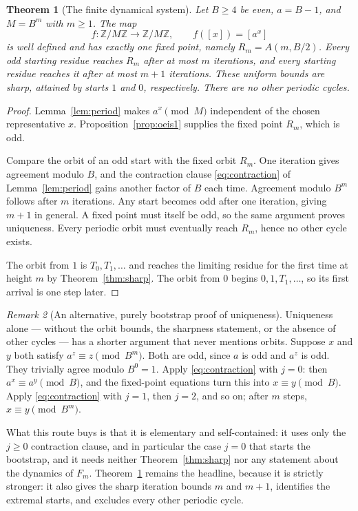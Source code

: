 \documentclass[11pt,letterpaper]{article}
\numberwithin{equation}{section}
\newtheorem{theorem}{Theorem}[section]
\theoremstyle{definition}
\theoremstyle{remark}
\newtheorem{remark}[theorem]{Remark}
\newcommand{\Z}{\mathbb Z}
\begin{document}
\begin{theorem}[The finite dynamical system]\label{thm:dynamics}
Let $B\ge4$ be even, $a=B-1$, and $M=B^m$ with $m\ge1$. The map
\[
 f:\Z/M\Z\longrightarrow\Z/M\Z,\qquad f([x])=[a^x]
\]
is well defined and has exactly one fixed point, namely $R_m=A(m,B/2)$. Every odd starting residue reaches $R_m$ after at most $m$ iterations, and every starting residue reaches it after at most $m+1$ iterations. These uniform bounds are sharp, attained by starts $1$ and $0$, respectively. There are no other periodic cycles.
\end{theorem}
\begin{proof}
Lemma~\ref{lem:period} makes $a^x\pmod M$ independent of the chosen representative $x$. Proposition~\ref{prop:oeis1} supplies the fixed point $R_m$, which is odd.

Compare the orbit of an odd start with the fixed orbit $R_m$. One iteration gives agreement modulo $B$, and the contraction clause \eqref{eq:contraction} of Lemma~\ref{lem:period} gains another factor of $B$ each time. Agreement modulo $B^m$ follows after $m$ iterations. Any start becomes odd after one iteration, giving $m+1$ in general. A fixed point must itself be odd, so the same argument proves uniqueness. Every periodic orbit must eventually reach $R_m$, hence no other cycle exists.

The orbit from $1$ is $T_0,T_1,\ldots$ and reaches the limiting residue for the first time at height $m$ by Theorem~\ref{thm:sharp}. The orbit from $0$ begins $0,1,T_1,\ldots$, so its first arrival is one step later.
\end{proof}

\begin{remark}[An alternative, purely bootstrap proof of uniqueness]\label{rem:bootstrap}
Uniqueness alone --- without the orbit bounds, the sharpness statement, or the absence of other cycles --- has a shorter argument that never mentions orbits. Suppose $x$ and $y$ both satisfy $a^z\equiv z\pmod{B^m}$. Both are odd, since $a$ is odd and $a^z$ is odd. They trivially agree modulo $B^0=1$. Apply \eqref{eq:contraction} with $j=0$: then $a^x\equiv a^y\pmod B$, and the fixed-point equations turn this into $x\equiv y\pmod B$. Apply \eqref{eq:contraction} with $j=1$, then $j=2$, and so on; after $m$ steps, $x\equiv y\pmod{B^m}$.

What this route buys is that it is elementary and self-contained: it uses only the $j\ge0$ contraction clause, and in particular the case $j=0$ that starts the bootstrap, and it needs neither Theorem~\ref{thm:sharp} nor any statement about the dynamics of $F_m$. Theorem~\ref{thm:dynamics} remains the headline, because it is strictly stronger: it also gives the sharp iteration bounds $m$ and $m+1$, identifies the extremal starts, and excludes every other periodic cycle.
\end{remark}
\end{document}
